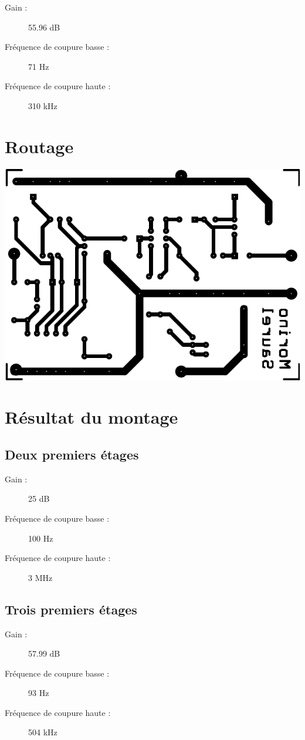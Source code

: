 \documentclass[11pt;a4paper]{report}
\begin{document}
   \begin{description}
    \item[Gain :]55.96 dB
    \item[Fréquence de coupure basse :]71 Hz
    \item[Fréquence de coupure haute :]310 kHz
   \end{description}
 
 \chapter{Routage}
  \begin{center}
   \includegraphics{images/layout} %
  \end{center}

 \chapter{Résultat du montage}
  \section{Deux premiers étages}
   \begin{description}
    \item[Gain :]25 dB
    \item[Fréquence de coupure basse :]100 Hz
    \item[Fréquence de coupure haute :]3 MHz
   \end{description}

  \section{Trois premiers étages}
   \begin{description}
    \item[Gain :]57.99 dB
    \item[Fréquence de coupure basse :]93 Hz
    \item[Fréquence de coupure haute :]504 kHz
   \end{description}
\end{document}
